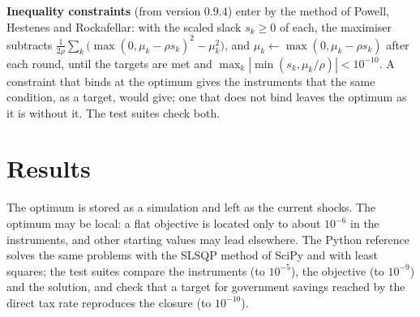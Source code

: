 \textbf{Inequality constraints} (from version 0.9.4) enter by the method of
Powell, Hestenes and Rockafellar: with the scaled slack $s_k \ge 0$ of each, the
maximiser subtracts $\frac{1}{2\rho}\sum_k \bigl(\max(0, \mu_k - \rho s_k)^2 -
\mu_k^2\bigr)$, and $\mu_k \leftarrow \max(0, \mu_k - \rho s_k)$ after each round,
until the targets are met and $\max_k |\min(s_k, \mu_k/\rho)| < 10^{-10}$. A
constraint that binds at the optimum gives the instruments that the same
condition, as a target, would give; one that does not bind leaves the optimum
as it is without it. The test suites check both.

\section{Results}

The optimum is stored as a simulation and left as the current shocks. The
optimum may be local: a flat objective is located only to about $10^{-6}$ in
the instruments, and other starting values may lead elsewhere. The Python
reference solves the same problems with the SLSQP method of SciPy and with
least squares; the test suites compare the instruments (to $10^{-5}$), the
objective (to $10^{-9}$) and the solution, and check that a target for
government savings reached by the direct tax rate reproduces the closure
 (to $10^{-10}$).
